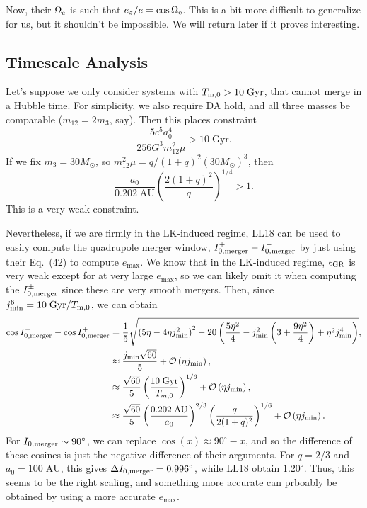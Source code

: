 \documentclass[11pt,
        usenames, %
        dvipsnames %
    ]{article}
\newcommand*{\p}[1]{\left(#1\right)}
\begin{document}
Now, their $\Omega_{\rm e}$ is such that $e_z / e = \cos \Omega_{\rm e}$. This
is a bit more difficult to generalize for us, but it shouldn't be impossible. We
will return later if it proves interesting.

\subsection{Timescale Analysis}

Let's suppose we only consider systems with $T_{\rm m, 0} > 10\;\mathrm{Gyr}$,
that cannot merge in a Hubble time. For simplicity, we also require DA hold, and
all three masses be comparable ($m_{12} = 2m_3$, say). Then this places
constraint
\begin{equation}
    \frac{5c^5a_0^4}{256G^3m_{12}^2\mu} > 10\;\mathrm{Gyr}.
\end{equation}
If we fix $m_3 = 30M_{\odot}$, so $m_{12}^2\mu = q / (1+q)^2\p{30M_{\odot}}^3$,
then
\begin{equation}
    \frac{a_0}{0.202\;\mathrm{AU}}\p{\frac{2(1 + q)^2}{q}}^{1/4} > 1.
\end{equation}
This is a very weak constraint.

Nevertheless, if we are firmly in the LK-induced regime, LL18 can be used to
easily compute the quadrupole merger window, $I_{\rm 0, merger}^+ - I_{\rm 0,
merger}^-$ by just using their Eq.~(42) to compute $e_{\max}$. We know that in
the LK-induced regime, $\epsilon_{\rm GR}$ is very weak except for at very large
$e_{\max}$, so we can likely omit it when computing the $I_{\rm 0,
merger}^{\pm}$ since these are very smooth mergers. Then, since $j_{\min}^6 =
10\;\mathrm{Gyr} / T_{\rm m, 0}$, we can obtain
\begin{align}
    \cos I_{\rm 0, merger}^- - \cos I_{\rm 0, merger}^+
        &= \frac{1}{5}\sqrt{
            \p{5\eta - 4\eta j_{\min}^2}^2
            - 20\p{\frac{5\eta^2}{4}
                - j_{\min}^2\p{3 + \frac{9\eta^2}{4}}
                + \eta^2j_{\min}^4}},\\
        &\approx \frac{j_{\min}\sqrt{60}}{5}
            + \mathcal{O}\p{\eta j_{\min}},\\
        &\approx \frac{\sqrt{60}}{5}\p{\frac{10\;\mathrm{Gyr}}{T_{m, 0}}}^{1/6}
            + \mathcal{O}\p{\eta j_{\min}},\\
        &\approx \frac{\sqrt{60}}{5}\p{\frac{0.202\;\mathrm{AU}}{a_0}}^{2/3}
            \p{\frac{q}{2(1+q)^2}}^{1/6}
            + \mathcal{O}\p{\eta j_{\min}}.
\end{align}
For $I_{\rm 0, merger} \sim 90^\circ$, we can replace $\cos(x) \approx 90^\circ
- x$, and so the difference of these cosines is just the negative difference of
their arguments. For $q = 2/3$ and $a_0 = 100\;\mathrm{AU}$, this gives $\Delta
I_{\rm 0, merger} = 0.996^\circ$, while LL18 obtain $1.20^\circ$. Thus, this
seems to be the right scaling, and something more accurate can prboably be
obtained by using a more accurate $e_{\max}$.
\end{document}
